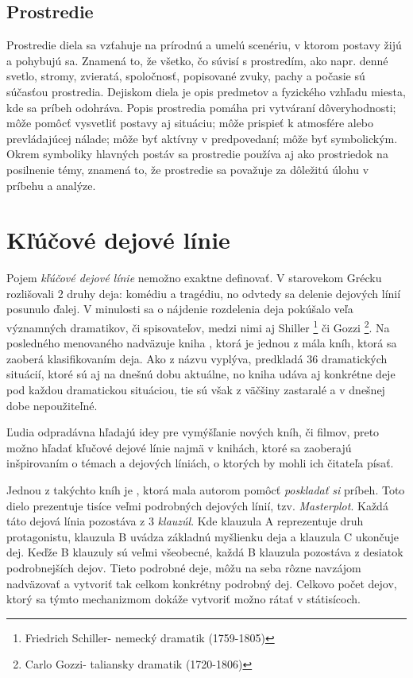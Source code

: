\subsection*{Prostredie}
Prostredie diela sa vzťahuje na prírodnú a umelú scenériu, v ktorom postavy žijú a pohybujú sa. Znamená to, že všetko, čo súvisí s prostredím, ako napr. denné svetlo, stromy, zvieratá, spoločnosť, popisované zvuky, pachy a počasie sú súčasťou prostredia. Dejiskom diela je opis predmetov a fyzického vzhľadu miesta, kde sa príbeh odohráva.
Popis prostredia pomáha pri vytváraní dôveryhodnosti; môže pomôcť vysvetliť postavy aj situáciu; môže prispieť k atmosfére alebo prevládajúcej nálade; môže byť aktívny v predpovedaní; môže byť symbolickým. Okrem symboliky hlavných postáv sa prostredie používa aj ako prostriedok na posilnenie témy, znamená to, že prostredie sa považuje za dôležitú úlohu v príbehu a analýze.



\section{Kľúčové dejové línie}
Pojem \textit{kľúčové dejové línie} nemožno exaktne definovať. V starovekom Grécku rozlišovali 
2 druhy deja: komédiu a tragédiu, no odvtedy sa delenie dejových línií posunulo ďalej. V minulosti sa o nájdenie rozdelenia deja pokúšalo veľa významných dramatikov, či spisovateľov, medzi nimi aj Shiller \footnote{Friedrich Schiller- nemecký dramatik (1759-1805)
} či Gozzi \footnote{Carlo Gozzi- taliansky dramatik (1720-1806)}. Na posledného menovaného nadväzuje kniha  \cite{Polti:1921}, ktorá je jednou z mála kníh, ktorá sa zaoberá klasifikovaním deja. Ako z názvu vyplýva, predkladá 36 dramatických situácií, ktoré sú aj na dnešnú dobu aktuálne, no kniha udáva aj konkrétne deje pod každou dramatickou situáciou, tie sú však z väčšiny zastaralé a v dnešnej dobe nepoužiteľné.

Ľudia odpradávna hľadajú idey pre vymýšľanie nových kníh, či filmov, preto možno hľadať kľučové dejové línie najmä v knihách, ktoré sa zaoberajú inšpirovaním o témach a dejových líniách, o ktorých by mohli ich čitateľa písať. 

Jednou z takýchto kníh je  \cite{Cook:1928}, ktorá mala autorom pomôcť \textit{poskladať si} príbeh. Toto dielo prezentuje tisíce veľmi podrobných dejových línií, tzv. \textit{Masterplot}. Každá táto dejová línia pozostáva z 3 \textit{klauzúl}. Kde klauzula A reprezentuje druh protagonistu, klauzula B uvádza základnú myšlienku deja a klauzula C ukončuje dej. Keďže B klauzuly sú veľmi všeobecné, každá B klauzula pozostáva z desiatok podrobnejších dejov. Tieto podrobné deje, môžu na seba rôzne navzájom nadväzovať a vytvoriť tak celkom konkrétny podrobný dej. Celkovo počet dejov, ktorý sa týmto mechanizmom dokáže vytvoriť možno rátať v státisícoch.

